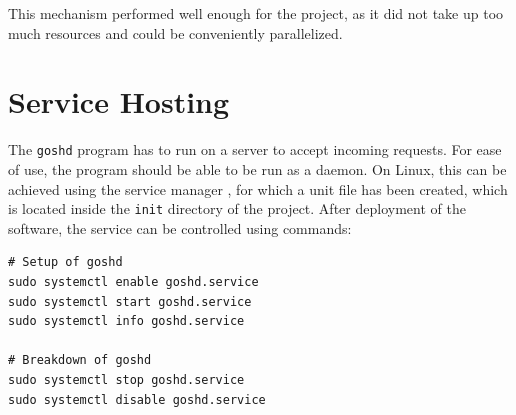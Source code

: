 \documentclass[10pt,a4paper,titlepage,twoside,english,final]{zhawreprt}
\begin{document}
This mechanism performed well enough for the project, as it did not take up too much resources and could be conveniently parallelized.


\section{Service Hosting}\label{sec:ImplServiceHosting}
The \texttt{goshd} program has to run on a server to accept incoming requests.
For ease of use, the program should be able to be run as a \gls{daemon}.
On \gls{Linux}, this can be achieved using the service manager \cite{systemd}, for which a unit file has been created, which is located inside the \texttt{init} directory of the project.
After deployment of the software, the service can be controlled using \cite{systemd} commands:
\setlistingBash
\begin{lstlisting}[caption={\texttt{goshd} service control},label=lst:GoshdServiceCtl,deletekeywords={enable}]
# Setup of goshd
sudo systemctl enable goshd.service
sudo systemctl start goshd.service
sudo systemctl info goshd.service

# Breakdown of goshd
sudo systemctl stop goshd.service
sudo systemctl disable goshd.service
\end{lstlisting}
\end{document}
